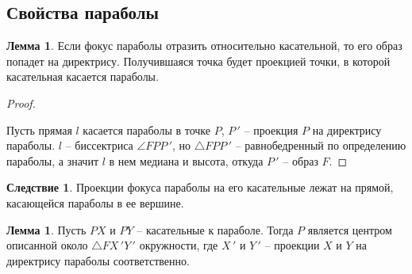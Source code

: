 \documentclass[12pt]{article}
\theoremstyle{definition}
\newtheorem{lemma}[theorem]{Лемма}
\newtheorem{consequence}{Следствие}[subsection]
\begin{document}
\subsection{Свойства параболы}
    \begin{lemma}
        Если фокус параболы отразить относительно касательной, то его образ попадет на директрису. Получившаяся точка будет проекцией точки, в которой касательная касается параболы.
    \end{lemma}
    \begin{proof}
    $ $\newline
    \begin{center}
    \end{center}
        Пусть прямая $l$ касается параболы в точке $P$, $P\,'$ -- проекция $P$ на директрису параболы. $l$ -- биссектриса $\angle FPP\,'$, но $\triangle FPP\,'$ -- равнобедренный по определению параболы, а значит $l$ в нем медиана и высота, откуда $P\,'$ -- образ $F$.
    \end{proof}
    \setcounter{subsection}{7}
    \begin{consequence}
        Проекции фокуса параболы на его касательные лежат на прямой, касающейся параболы в ее вершине.
    \end{consequence}
    \begin{lemma}
        Пусть $PX$ и $PY$ -- касательные к параболе. Тогда $P$ является центром описанной около $\triangle FX\,'Y\,'$ окружности, где $X\,'$ и $Y\,'$ -- проекции $X$ и $Y$ на директрису параболы соответственно.
    \end{lemma}
\end{document}
